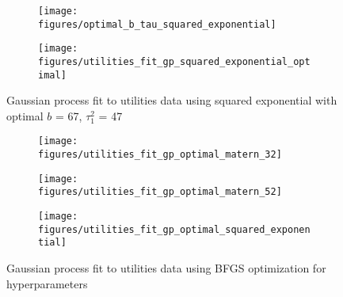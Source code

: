 \documentclass[10pt]{article}
\begin{document}
\begin{enumerate}[label=(\Alph*)]
            \begin{figure}
                \begin{subfigure}{.5\textwidth}
                  \centering
                  \texttt{[image: figures/optimal\_b\_tau\_squared\_exponential]}
                \end{subfigure}%
                \begin{subfigure}{.5\textwidth}
                  \centering
                  \texttt{[image: figures/utilities\_fit\_gp\_squared\_exponential\_optimal]}
                \end{subfigure}
            \caption{Gaussian process fit to utilities data using squared exponential with optimal $b$ = 67, $\tau_1^2$ = 47}
            \label{fig:gp_fit_utilities_optimal}
            \end{figure}

            \begin{figure}
                \centering
                \begin{subfigure}{.5\textwidth}
                  \centering
                  \texttt{[image: figures/utilities\_fit\_gp\_optimal\_matern\_32]}
                \end{subfigure}%
                \begin{subfigure}{.5\textwidth}
                  \centering
                  \texttt{[image: figures/utilities\_fit\_gp\_optimal\_matern\_52]}
                \end{subfigure}
                \begin{subfigure}{.5\textwidth}
                  \centering
                  \texttt{[image: figures/utilities\_fit\_gp\_optimal\_squared\_exponential]}
                \end{subfigure}
            \caption{Gaussian process fit to utilities data using BFGS optimization for hyperparameters}
            \label{fig:gp_fit_utilities_optimal_lm}
            \end{figure}

            \clearpage


\end{enumerate}
\end{document}
